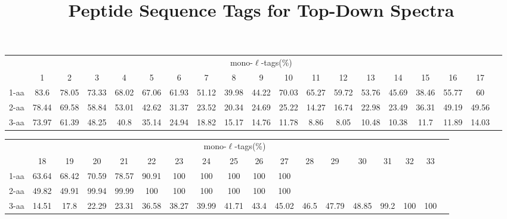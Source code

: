 \documentclass{article}[12pt]
\title{Peptide Sequence Tags for Top-Down Spectra}
\author{}
\begin{document}
\maketitle

\doublespacing
\begin{abstract}


\end{abstract}


\begin{landscape}

\begin{table}[h]\tiny
\vspace{3mm}
{\centering
\begin{center}
\begin{tabular}{|l|c|c|c|c|c|c|c|c|c|c|c|c|c|c|c|c|c|c|}
  \hline
  & \multicolumn{ 17 }{|c|}{mono-$\ell$-tags(\%)} \\
  \cline{2- 18}
    & 1 & 2 & 3 & 4 & 5 & 6 & 7 & 8 & 9 & 10 & 11 & 12 & 13 & 14 & 15 & 16 & 17\\
  \hline
1-aa  & 83.6 & 78.05 & 73.33 & 68.02 & 67.06 & 61.93 & 51.12 & 39.98 & 44.22 & 70.03 & 65.27 & 59.72 & 53.76 & 45.69 & 38.46 & 55.77 & 60\\
2-aa  & 78.44 & 69.58 & 58.84 & 53.01 & 42.62 & 31.37 & 23.52 & 20.34 & 24.69 & 25.22 & 14.27 & 16.74 & 22.98 & 23.49 & 36.31 & 49.19 & 49.56\\
3-aa  & 73.97 & 61.39 & 48.25 & 40.8 & 35.14 & 24.94 & 18.82 & 15.17 & 14.76 & 11.78 & 8.86 & 8.05 & 10.48 & 10.38 & 11.7 & 11.89 & 14.03\\
 \hline
\end{tabular}
\end{center}
\par}
\centering

\vspace{3mm}
\end{table}
\begin{table}[h]\tiny
\vspace{3mm}
{\centering
\begin{center}
\begin{tabular}{|l|c|c|c|c|c|c|c|c|c|c|c|c|c|c|c|c|c|}
  \hline
  & \multicolumn{ 16 }{|c|}{mono-$\ell$-tags(\%)} \\
  \cline{2- 17}
    & 18 & 19 & 20 & 21 & 22 & 23 & 24 & 25 & 26 & 27 & 28 & 29 & 30 & 31 & 32 & 33\\
  \hline
1-aa  & 63.64 & 68.42 & 70.59 & 78.57 & 90.91 & 100 & 100 & 100 & 100 & 100 &  &  &  &  &  & \\
2-aa  & 49.82 & 49.91 & 99.94 & 99.99 & 100 & 100 & 100 & 100 & 100 & 100 &  &  &  &  &  & \\
3-aa  & 14.51 & 17.8 & 22.29 & 23.31 & 36.58 & 38.27 & 39.99 & 41.71 & 43.4 & 45.02 & 46.5 & 47.79 & 48.85 & 99.2 & 100 & 100\\
 \hline
\end{tabular}
\end{center}
\par}
\centering


\end{table}
\end{landscape}
\end{document}
